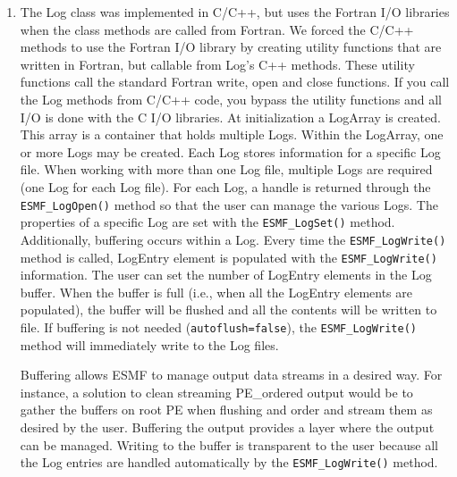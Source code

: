 %
\begin{enumerate}
\item The Log class was implemented in C/C++, but uses the Fortran I/O 
libraries when the class methods are called from Fortran. We forced the C/C++
methods to use the Fortran I/O library by creating utility functions that are
written in Fortran, but callable from Log's C++ methods.  These utility 
functions call the standard Fortran write, open and close functions.  If you
call the Log methods from C/C++ code, you bypass the utility functions and 
all I/O is done with the C I/O libraries.
At initialization a LogArray is created.  This array is a container that holds
multiple Logs.  Within the LogArray, one or more Logs may be created.  Each Log
stores information for a specific Log file.   When working with more than one 
Log file, multiple Logs are required (one Log for each Log file).  For each 
Log, a handle is returned through the {\tt ESMF\_LogOpen()} method so that the
user can manage the various Logs.  The properties of a specific Log are set 
with the {\tt ESMF\_LogSet()} method.  Additionally, buffering occurs within a
Log.  Every time the {\tt ESMF\_LogWrite()} method is called, LogEntry element
is populated with the {\tt ESMF\_LogWrite()} information.  The user can set the
number of LogEntry elements in the Log buffer.  When the buffer is full (i.e.,
when all the LogEntry elements are populated), the buffer will be flushed and
all the contents will be written to file.  If buffering is not needed 
({\tt autoflush=false}), the {\tt ESMF\_LogWrite()} method will immediately 
write to the Log files. 

Buffering allows ESMF to manage output data streams in a desired way.  For 
instance, a solution to clean streaming PE\_ordered output would be to gather
the buffers on root PE when flushing and order and stream them as desired by
the user.  Buffering the output provides a layer where the output can be
managed.  Writing to the buffer is transparent to the user because all the Log
entries are handled automatically by the {\tt ESMF\_LogWrite()} method. 
\end{enumerate}




